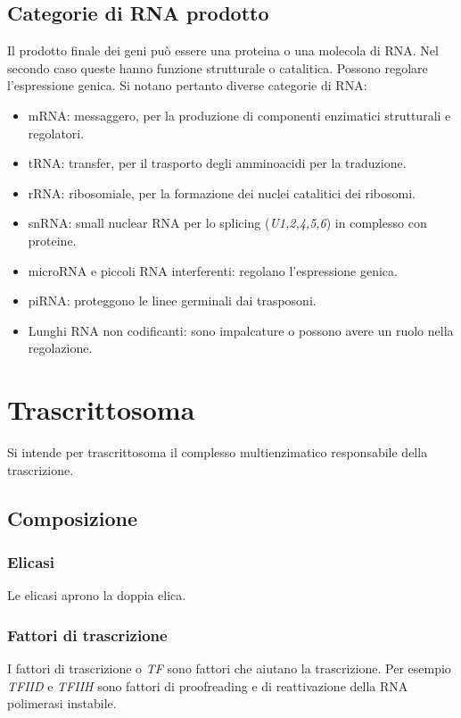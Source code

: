 	\subsection{Categorie di RNA prodotto}
	Il prodotto finale dei geni pu\`o essere una proteina o una molecola di RNA.
	Nel secondo caso queste hanno funzione strutturale o catalitica.
	Possono regolare l'espressione genica.
	Si notano pertanto diverse categorie di RNA:
	\begin{multicols}{2}
		\begin{itemize}
			\item mRNA: messaggero, per la produzione di componenti enzimatici strutturali e regolatori.
			\item tRNA: transfer, per il trasporto degli amminoacidi per la traduzione.
			\item rRNA: ribosomiale, per la formazione dei nuclei catalitici dei ribosomi.
			\item snRNA: small nuclear RNA per lo splicing (\emph{U1,2,4,5,6}) in complesso con proteine.
			\item microRNA e piccoli RNA interferenti: regolano l'espressione genica.
			\item piRNA: proteggono le linee germinali dai trasposoni.
			\item Lunghi RNA non codificanti: sono impalcature o possono avere un ruolo nella regolazione.
		\end{itemize}
	\end{multicols}

\section{Trascrittosoma}
Si intende per trascrittosoma il complesso multienzimatico responsabile della trascrizione.

	\subsection{Composizione}

		\subsubsection{Elicasi}
		Le elicasi aprono la doppia elica.

		\subsubsection{Fattori di trascrizione}
		I fattori di trascrizione o \emph{TF} sono fattori che aiutano la trascrizione.
		Per esempio \emph{TFIID} e \emph{TFIIH} sono fattori di proofreading e di reattivazione della RNA polimerasi instabile.

